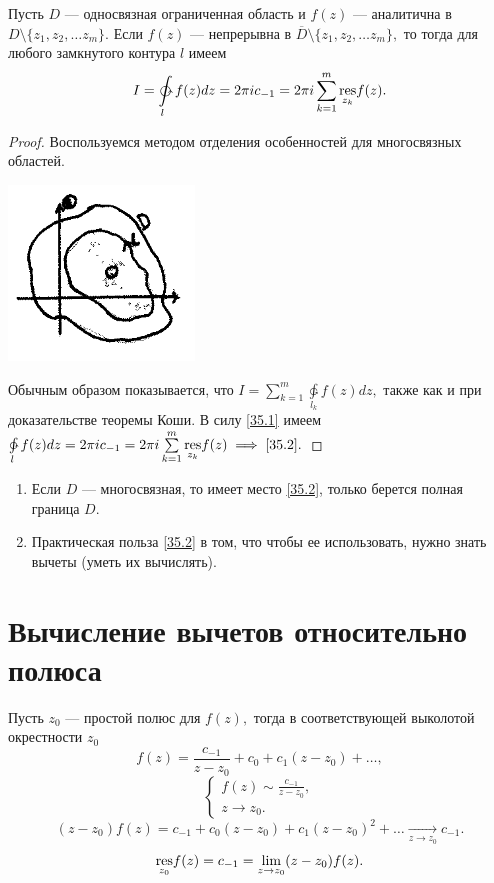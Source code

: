 \documentclass[../../main.tex]{subfiles}
\begin{document}
	\begin{thm}
		Пусть $D$ --- односвязная ограниченная область и $f(z)$ --- аналитична в $D 
		\setminus\{z_1, z_2, \ldots z_m\}.$
		Если  $f(z)$ --- непрерывна в $\overline{D}\setminus\{z_1, z_2, \ldots 
		z_m\},$ 
		то тогда для любого замкнутого контура $l$ имеем
		\begin{equation} \label{35.2}
			I = \ointctrclockwise\limits_{l} f(z)dz = 2\pi i c_{-1} = 2 \pi i 
			\sum_{k=1}^{m}\underset{z_k}{\res} f(z).
		\end{equation}
	\end{thm}	
	\begin{proof}
		Воспользуемся методом отделения особенностей для многосвязных областей.
		\begin{center}
	 	\includegraphics{lec35_1}
	 	\end{center}
		
		Обычным образом показывается, что $I = \sum\limits_{k=1}^{m} 
		\ointctrclockwise\limits_{l_k} f(z)dz,$ 
		также как и при доказательстве теоремы Коши. 
		В силу \eqref{35.1} имеем $\ointctrclockwise\limits_{l} f(z)dz = 2\pi i 
		c_{-1} = 2 \pi i \sum\limits_{k=1}^{m}\underset{z_k}{\res} f(z) \implies 
		\eqref{35.2}.$
	\end{proof}	

	\rems
	\begin{enumerate}
		\item Если $D$ --- многосвязная, то имеет место \eqref{35.2}, только берется 
		полная граница $D.$
		\item Практическая польза \eqref{35.2} в том, что чтобы ее использовать, 
		нужно знать вычеты (уметь их вычислять).
	\end{enumerate}
	
	\section{Вычисление вычетов относительно полюса}
	Пусть $z_0$ --- простой полюс для $f(z),$ тогда в соответствующей выколотой 
	окрестности $z_0$
	\[
		f(z) = \frac{c_{-1}}{z-z_0} + c_0 + c_1(z-z_0) + \ldots,
	\]
	\[
		\begin{cases}
		f(z) \sim \frac{c_{-1}}{z - z_0},\\
		z \to z_0.
		\end{cases}
	\]
	\[
		(z-z_0)f(z) = c_{-1} + c_0(z-z_0) + c_1(z-z_0)^2 + \ldots \underset{z \to 
		z_0}{\to} c_{-1}. 
	\]
	\begin{equation} \label{35.3}
		\underset{z_0}{\operatorname{res}} f(z) = c_{-1} = \lim\limits_{z\to z_0}(z-z_0)f(z).
	\end{equation}
	
\end{document}
